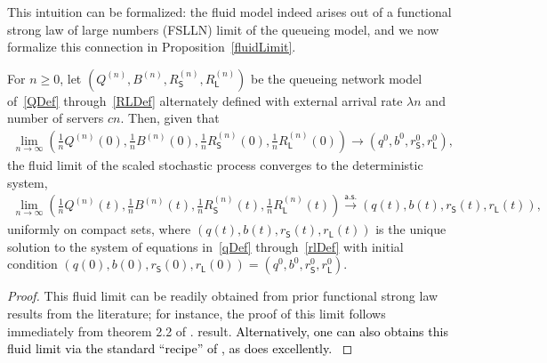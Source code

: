 \documentclass[manuscript,screen,authorversion]{acmart}
\newcommand{\rev}[1]{\textcolor{black}{#1}}
\begin{document}
This intuition can be formalized: the fluid model indeed arises out of a functional strong law of large numbers (FSLLN) limit of the queueing model, and we now formalize this connection in Proposition~\ref{fluidLimit}.

\begin{proposition}\label{fluidLimit}
For $n \geq 0$, let $\left(Q^{(n)}, B^{(n)}, R_\mathsf{S}^{(n)}, R_\mathsf{L}^{(n)}\right)$ be the queueing network model of~\eqref{QDef} through~\eqref{RLDef} alternately defined with external arrival rate $\lambda n$ and number of servers $c n$. Then, given that
\begin{align}
\lim_{n \to \infty}
\left(\frac{1}{n}Q^{(n)}(0), \frac{1}{n}B^{(n)}(0), \frac{1}{n}R_\mathsf{S}^{(n)}(0), \frac{1}{n}R_\mathsf{L}^{(n)}(0)\right)
\longrightarrow
\left(q^0, b^0, r_\mathsf{S}^0, r_\mathsf{L}^0\right)
,
\end{align}
the fluid limit of the scaled stochastic process converges to the deterministic system,
\begin{align}
\lim_{n \to \infty}
\left(\frac{1}{n}Q^{(n)}(t), \frac{1}{n}B^{(n)}(t), \frac{1}{n}R_\mathsf{S}^{(n)}(t), \frac{1}{n}R_\mathsf{L}^{(n)}(t)\right)
\stackrel{\mathsf{a.s.}}{\longrightarrow}
\left(q(t), b(t), r_\mathsf{S}(t), r_\mathsf{L}(t)\right)
,
\end{align}
uniformly on compact sets, where $\left(q(t), b(t), r_\mathsf{S}(t), r_\mathsf{L}(t)\right)$ is the unique solution to the system of equations in~\eqref{qDef} through~\eqref{rlDef} with initial condition $\left(q(0), b(0), r_\mathsf{S}(0), r_\mathsf{L}(0)\right) = \left(q^0, b^0, r_\mathsf{S}^0, r_\mathsf{L}^0\right)$.
\end{proposition}
\begin{proof}
This fluid limit can be readily obtained from prior functional strong law results from the literature; for instance, the proof of this limit follows immediately from theorem 2.2 of \citet{mandelbaum1998strong}.%
result. \rev{Alternatively, one can also obtains this fluid limit via the standard ``recipe'' of \citet{ethier2009markov}, as \citet{ding2015fluid} does excellently. %
}
\end{proof}
\end{document}
